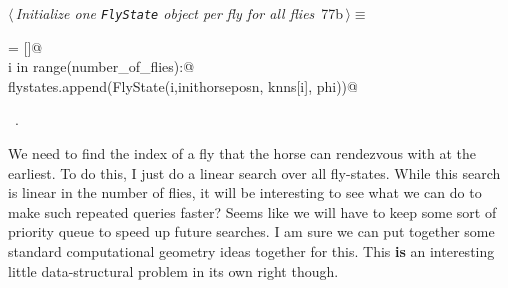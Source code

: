 \documentclass[11.5pt]{report}
\begin{document}
\vspace{-0.8cm} \newchunk
\begin{flushleft} \small
\begin{minipage}{\linewidth}\label{scrap115}\raggedright\small
{} $\langle\,${\itshape Initialize one \verb|FlyState| object per fly for all flies}\nobreak\ {\footnotesize {77b}}$\,\rangle\equiv$
\vspace{-1ex}
\begin{list}{}{} \item
\mbox{}\verb@flystates = []@\\
\mbox{}\verb@for i in range(number_of_flies):@\\
\mbox{}\verb@    flystates.append(FlyState(i,inithorseposn, knns[i], phi))@\\
\mbox{}\verb@@{\NWsep}
\end{list}
\vspace{-1.5ex}
\footnotesize
\begin{list}{}{\setlength{\itemsep}{-\parsep}\setlength{\itemindent}{-\leftmargin}}
\item \NWtxtMacroRefIn\ .

\item{}
\end{list}
\end{minipage}\vspace{4ex}
\end{flushleft}

\vspace{-0.8cm} \newchunk We need to find the index of a fly that the horse can rendezvous with at the earliest. To do this, I just
do a linear search over all fly-states. While this search is linear in the number of flies, it will be interesting to see what 
we can do to make such repeated queries faster? Seems like we will have to keep some sort of priority 
queue to speed up future searches. I am sure we can put together some standard computational geometry ideas together 
for this. This \textbf{is} an interesting little data-structural problem in its own right though. 
\end{document}
